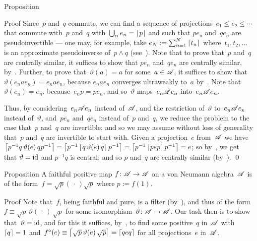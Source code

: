 \documentclass[a]{subfiles}
\begin{document}
\begin{parsec}
\begin{point}{Proposition}
\begin{point}{Proof}
Since~$p$ and~$q$ commute,
we can find a sequence
of projections~$e_1\leq e_2 \leq \dotsb$
that commute with~$p$ and~$q$
with~$\bigcup_n e_n =\left\lceil p\right\rceil$
and such that $pe_n$ and~$qe_n$
are pseudoinvertible --- one may,
for example,
take $e_N:=\sum_{n=1}^N \left\lceil t_n\right\rceil$
where~$t_1,t_2,\dotsc$
is an approximate pseudoinverse
of~$p\wedge q$ (see~).
Note that to prove that~$p$ and~$q$ are centrally similar,
it suffices to show that $pe_n$ and~$qe_n$ are centrally similar,
by~.
Further, to prove that~$\vartheta(a)=a$
for some~$a\in\mathscr{A}$,
it suffices to show that~$\vartheta( e_n a e_n  ) = e_n a e_n$,
because $e_n a e_n$ converges ultraweakly to~$a$
by~\TODO{}.
Note that~$\vartheta(e_n)=e_n$,
because~$e_np=pe_n$,
and so~$\vartheta$ maps~$e_n\mathscr{A} e_n$ into~$e_n \mathscr{A} e_n$.

Thus, by considering~$e_n \mathscr{A} e_n$ 
instead of~$\mathscr{A}$,
and the restriction of~$\vartheta$ to~$e_n\mathscr{A} e_n$
instead of~$\vartheta$,
and~$pe_n$ and~$qe_n$
instead of~$p$ and~$q$,
we reduce the problem to the case that~$p$ and~$q$ are invertible;
and so we may assume without loss of generality that~$p$ and~$q$
are invertible to start with.
Given a projection~$e$ from~$\mathscr{A}$
we have $\left\lceil p^{-1}q \,\vartheta(e)\, q p^{-1}\right\rceil
= \left\lceil p^{-1}\left\lceil q\,\vartheta(e)\,q\right\rceil p^{-1}\right\rceil
= \left\lceil p^{-1}\left\lceil pep\right\rceil p^{-1}\right\rceil=e$;
so 
by~,
we get that
$\vartheta=\operatorname{id}$
and
$p^{-1}q$ is central;
and so
$p$ and~$q$ are centrally similar (by~).
\qed
\end{point}
\end{point}
\begin{point}{Proposition}%
A faithful positive map $f\colon \mathscr{A}\to\mathscr{A}$
on a von Neumann algebra~$\mathscr{A}$
is of the form~$f=\sqrt{p}(\,\cdot\,)\sqrt{p}$
where $p:=f(1)$.
\begin{point}{Proof}%
Note that~$f$,
being faithful and pure,
is a filter
(by~),
and thus of the form $f\equiv \sqrt{p}\,\vartheta(\,\cdot\,)\,\sqrt{p}$
for some isomorphism~$\vartheta\colon \mathscr{A}\to\mathscr{A}$.
Our task then is to show that~$\vartheta=\operatorname{id}$,
and for this
it suffices, by~,
to find some positive~$q$ in~$\mathscr{A}$ with~$\left\lceil q\right\rceil=1$
and~$f^\diamond(e)\equiv\left\lceil\sqrt{p}\,\vartheta(e)\,\sqrt{p}\right\rceil
= \left\lceil qeq\right\rceil$ for all projections~$e$ in~$\mathscr{A}$.


\end{point}
\end{point}
\end{parsec}
\end{document}
